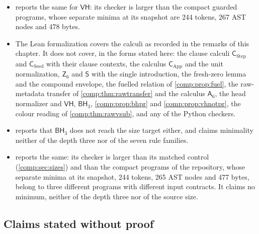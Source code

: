 \begin{itemize}
 rules is claimed: the chapter already contains other six-rule calculi with
 stronger normalization.
\item {} reports the same for $\mathsf{VH}$: its checker
 is larger than the compact guarded programs, whose separate minima at its
 snapshot are 244 tokens, 267 AST nodes and 478 bytes.
\item The Lean formalization covers the calculi as recorded in the remarks
 of this chapter. It does not cover, in the forms stated here: the clause
 calculi $\mathsf{C}_{\mathrm{Step}}$ and $\mathsf{C}_{\mathrm{Seed}}$ with
 their clause contexts, the calculus $\mathsf{C}_{\mathrm{App}}$ and the
 unit normalization, $\mathsf{Z}_6$ and $\mathsf{S}$ with the single
 introduction, the fresh-zero lemma and the compound envelope, the fuelled
 relation of \cref{comp:prop:fuel}, the raw-metadata transfer of
 \cref{comp:thm:rawtransfer} and the calculus $\mathsf{A}_6$, the head
 normalizer and $\mathsf{VH}$, $\mathsf{BH}_3$, \cref{comp:prop:bhpr} and
 \cref{comp:prop:vhnotpr}, the
 colour reading of \cref{comp:thm:rawvsub}, and any of the Python checkers.
\item {} reports that $\mathsf{BH}_3$ does not reach the
 size target either, and claims minimality neither of the depth three nor of
 the seven rule families.
\item {} reports the same: its checker is larger than
 its matched control (\cref{comp:sec:sizes}) and than the compact programs
 of the repository, whose separate minima at its snapshot, 244 tokens, 265
 AST nodes and 477 bytes, belong to three different programs with different
 input contracts. It claims no minimum, neither of the depth three nor of
 the source size.
\end{itemize}

\subsection{Claims stated without proof}

